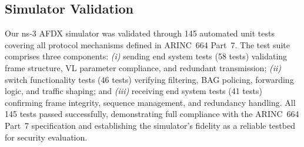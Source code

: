
\subsection{Simulator Validation}
\label{sec:simulator-validation}

Our ns-3 AFDX simulator was validated through 145 automated unit tests covering all protocol mechanisms defined in ARINC~664 Part~7. The test suite comprises three components: \textit{(i)} sending end system tests (58 tests) validating frame structure, VL parameter compliance, and redundant transmission; \textit{(ii)} switch functionality tests (46 tests) verifying filtering, BAG policing, forwarding logic, and traffic shaping; and \textit{(iii)} receiving end system tests (41 tests) confirming frame integrity, sequence management, and redundancy handling. All 145 tests passed successfully, demonstrating full compliance with the ARINC~664 Part~7 specification and establishing the simulator's fidelity as a reliable testbed for security evaluation.



